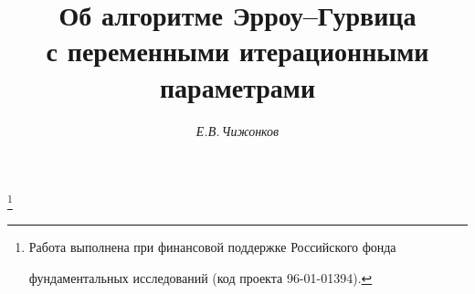 









\newcommand{\tts}[1]{}







 


\setcounter{page}{65}















\author{\it Е.В.\,Чижонков}




\title{Об алгоритме Эрроу--Гурвица\\


с переменными итерационными параметрами}


\thanks{Работа выполнена при финансовой поддержке Российского фонда


фундаментальных исследований (код проекта 96-01-01394).}





\date{}




\pagestyle{plain} %







\maketitle



